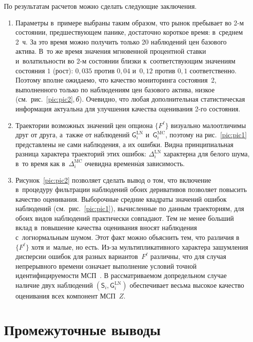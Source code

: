 \begin{multicols}{2}
По результатам расчетов можно сделать сле\-ду\-ющие заключения.
\begin{enumerate}
\item
Параметры в~примере выбраны таким образом, что рынок пребывает во 2-м состоянии, 
предшествующем панике, достаточно короткое время: в~среднем 2~ч. За это 
время можно получить только 20 наблюдений цен базового актива. В~то же время 
значения мгновенной процентной ставки и~волатильности во 2-м состоянии близки к~соответствующим значениям состояния $1$ (рост): $0,\!035$ против $0,\!04$ 
и~$0{,}12$ против $0{,}1$ соответственно. Поэтому вполне ожидаемо, что качество мониторинга состояния~2, выполненного только по наблюдениям цен базового 
актива, низкое (см.\ рис.~\ref{pic:pic2},\,\textit{б}). Очевидно, что любая 
дополнительная статистическая информация актуальна для улучшения качества 
оценивания 2-го состояния.
\item
Траектории возможных значений цен опциона $\{F^{\ell}\}$ визуально малоотличимы 
друг от друга, а~также от наблюдений $\mathsf{G}_i^{\mathrm{LN}}$ и~$\mathsf{G}_i^{\mathrm{MC}}$, 
поэтому на  рис.~\ref{pic:pic1} представлены не сами наблюдения, а их ошибки.  
Видна принципиальная разница характера траекторий этих ошибок: $\Delta_i^{\mathrm{LN}}$ 
характерна для белого шума, в~то время как  в~$\Delta_i^{\mathrm{MC}}$ очевидна 
временн$\acute{\mbox{а}}$я зависимость.
\item
Рисунок~\ref{pic:pic2} позволяет сделать вывод о том, что включение в~процедуру 
фильтрации наблюдений обоих деривативов позволяет повысить качество оценивания.
Выборочные средние квадраты значений ошибок наблюдений (см.\ рис.~\ref{pic:pic1}), вычисленные по данным траекториям, для обоих видов наблюдений 
практически совпадают. Тем не менее б$\acute{\mbox{о}}$льший вклад в~повышение качества 
оценивания вносят наблюдения с~логнормальным шумом. Этот факт можно объяснить 
тем, что различия в~$\{F^{\ell}\}$ хотя и~малые, но есть. Из-за 
мультипликативного характера зашумления дисперсии ошибок для разных вариантов~$F^{\ell}$ 
различны, что для случая непрерывного времени означает выполнение 
условий точной идентифицируемости МСП~\cite{BS_20}. В рассматриваемом 
допредельном случае наличие двух наблюдений $(\mathsf{S}_i, \mathsf{G}_i^{\mathrm{LN}})$ 
обеспечивает весьма высокое качество оценивания всех компонент МСП~$Z$.
\end{enumerate}

\vspace*{-9pt}

\section{Промежуточные выводы}


\end{multicols}
